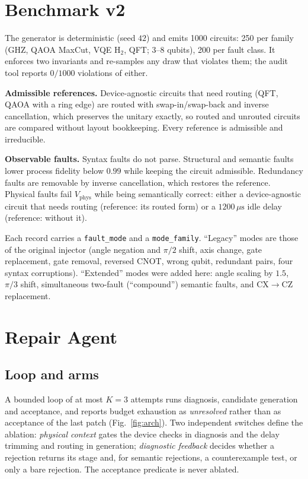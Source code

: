 \documentclass[journal]{IEEEtran}
\begin{document}
\section{Benchmark v2}
\label{sec:benchmark}

The generator is deterministic (seed $42$) and emits 1000 circuits: 250 per
family (GHZ, QAOA MaxCut, VQE $\mathrm{H}_2$, QFT; $3$--$8$ qubits), 200 per
fault class. It enforces two invariants and re-samples any draw that violates
them; the audit tool reports $0/1000$ violations of either.

\textbf{Admissible references.} Device-agnostic circuits that need routing
(QFT, QAOA with a ring edge) are routed with swap-in/swap-back and inverse
cancellation, which preserves the unitary exactly, so routed and unrouted
circuits are compared without layout bookkeeping. Every reference is
admissible and irreducible.

\textbf{Observable faults.} Syntax faults do not parse. Structural and semantic
faults lower process fidelity below $0.99$ while keeping the circuit admissible.
Redundancy faults are removable by inverse cancellation, which restores the
reference. Physical faults fail $V_{\mathrm{phys}}$ while being semantically
correct: either a device-agnostic circuit that needs routing (reference: its
routed form) or a $1200\,\mu\mathrm{s}$ idle delay (reference: without it).

Each record carries a \texttt{fault\_mode} and a \texttt{mode\_family}.
``Legacy'' modes are those of the original injector (angle negation and
$\pi/2$ shift, axis change, gate replacement, gate removal, reversed CNOT,
wrong qubit, redundant pairs, four syntax corruptions). ``Extended'' modes were
added here: angle scaling by $1.5$, $\pi/3$ shift, simultaneous two-fault
(``compound'') semantic faults, and CX$\to$CZ replacement.

\section{Repair Agent}
\label{sec:method}

\subsection{Loop and arms}

A bounded loop of at most $K=3$ attempts runs diagnosis, candidate generation
and acceptance, and reports budget exhaustion as \emph{unresolved} rather than as
acceptance of the last patch (Fig.~\ref{fig:arch}). Two independent switches
define the ablation: \emph{physical context} gates the device checks in
diagnosis and the delay trimming and routing in generation; \emph{diagnostic
feedback} decides whether a rejection returns its stage and, for semantic
rejections, a counterexample test, or only a bare rejection. The acceptance
predicate is never ablated.
\end{document}

